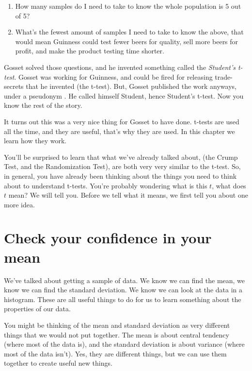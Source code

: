 \documentclass[
]{book}
\begin{document}
\begin{enumerate}
\def\labelenumi{\arabic{enumi}.}
\item
  How many samples do I need to take to know the whole population is 5 out of 5?
\item
  What's the fewest amount of samples I need to take to know the above, that would mean Guinness could test fewer beers for quality, sell more beers for profit, and make the product testing time shorter.
\end{enumerate}

Gosset solved those questions, and he invented something called the \emph{Student's t-test}. Gosset was working for Guinness, and could be fired for releasing trade-secrets that he invented (the t-test). But, Gosset published the work anyways, under a pseudonym \citep{Student1908}. He called himself Student, hence Student's t-test. Now you know the rest of the story.

It turns out this was a very nice thing for Gosset to have done. t-tests are used all the time, and they are useful, that's why they are used. In this chapter we learn how they work.

You'll be surprised to learn that what we've already talked about, (the Crump Test, and the Randomization Test), are both very very similar to the t-test. So, in general, you have already been thinking about the things you need to think about to understand t-tests. You're probably wondering what is this \(t\), what does \(t\) mean? We will tell you. Before we tell what it means, we first tell you about one more idea.

\hypertarget{check-your-confidence-in-your-mean}{%
\section{Check your confidence in your mean}\label{check-your-confidence-in-your-mean}}

We've talked about getting a sample of data. We know we can find the mean, we know we can find the standard deviation. We know we can look at the data in a histogram. These are all useful things to do for us to learn something about the properties of our data.

You might be thinking of the mean and standard deviation as very different things that we would not put together. The mean is about central tendency (where most of the data is), and the standard deviation is about variance (where most of the data isn't). Yes, they are different things, but we can use them together to create useful new things.
\end{document}
